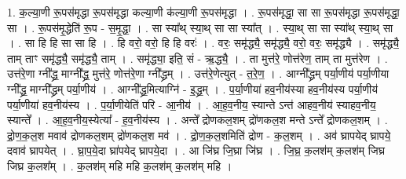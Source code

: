 \documentclass[17pt]{extarticle}
\begin{document}
1. क॒ल्या॒णी रू॒पस॑मृद्धा रू॒पस॑मृद्धा कल्या॒णी क॑ल्या॒णी रू॒पस॑मृद्धा । . रू॒पस॑मृद्धा॒ सा सा रू॒पस॑मृद्धा रू॒पस॑मृद्धा॒ सा । . रू॒पस॑मृ॒द्धेति॑ रू॒प - स॒मृ॒द्धा॒ । . सा स्या᳚थ् स्या॒थ् सा सा स्या᳚त् । . स्या॒थ् सा सा स्या᳚थ् स्या॒थ् सा । . सा हि हि सा सा हि । . हि वरो॒ वरो॒ हि हि वरः॑ । . वरः॒ समृ॑द्ध्यै॒ समृ॑द्ध्यै॒ वरो॒ वरः॒ समृ॑द्ध्यै । . समृ॑द्ध्यै॒ ताम् ताꣳ समृ॑द्ध्यै॒ समृ॑द्ध्यै॒ ताम् । . समृ॑द्ध्या॒ इति॒ सं - ऋ॒द्ध्यै॒ । . ता मुत्त॑रे॒ णोत्त॑रेण॒ ताम् ता मुत्त॑रेण । . उत्त॑रे॒णा ग्नी᳚द्ध्र॒ माग्नी᳚द्ध्र॒ मुत्त॑रे॒ णोत्त॑रे॒णा ग्नी᳚द्ध्रम् । . उत्त॑रे॒णेत्युत् - त॒रे॒ण॒ । . आग्नी᳚द्ध्रम् पर्या॒णीय॑ पर्या॒णीया ग्नी᳚द्ध्र॒ माग्नी᳚द्ध्रम् पर्या॒णीय॑ । . आग्नी᳚द्ध्र॒मित्याग्नि॑ - इ॒द्ध्र॒म् । . प॒र्या॒णीया॑ हव॒नीय॑स्या हव॒नीय॑स्य पर्या॒णीय॑ पर्या॒णीया॑ हव॒नीय॑स्य । . प॒र्या॒णीयेति॑ परि - आ॒नीय॑ । . आ॒ह॒व॒नीय॒ स्यान्ते ऽन्त॑ आहव॒नीय॑ स्याहव॒नीय॒ स्यान्ते᳚ । . आ॒ह॒व॒नीय॒स्येत्या᳚ - ह॒व॒नीय॑स्य । . अन्ते᳚ द्रोणकल॒शम् द्रो॑णकल॒श मन्ते ऽन्ते᳚ द्रोणकल॒शम् । . द्रो॒ण॒क॒ल॒श मवाव॑ द्रोणकल॒शम् द्रो॑णकल॒श मव॑ । . द्रो॒ण॒क॒ल॒शमिति॑ द्रोण - क॒ल॒शम् । . अव॑ घ्रापयेद् घ्रापये॒ दवाव॑ घ्रापयेत् । . घ्रा॒प॒ये॒दा घ्रा॑पयेद् घ्रापये॒दा । . आ जि॑घ्र जि॒घ्रा जि॑घ्र । . जि॒घ्र॒ क॒लश॑म् क॒लश॑म् जिघ्र जिघ्र क॒लश᳚म् । . क॒लश॑म् महि महि क॒लश॑म् क॒लश॑म् महि । \newline
\end{document}
